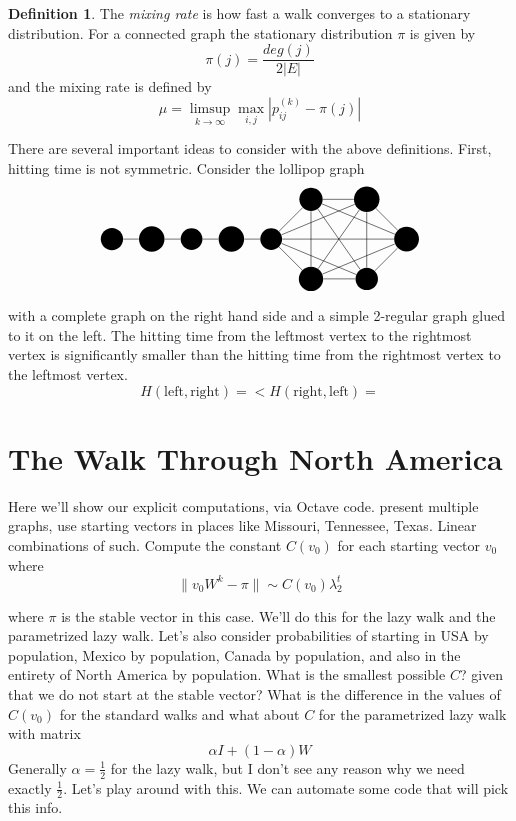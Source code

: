 \documentclass{article}
\theoremstyle{definition}
\newtheorem{defn}[thm]{Definition}
\theoremstyle{remark}
\numberwithin{equation}{section}
\begin{document}
\begin{defn}
The \emph{mixing rate} is how fast a walk converges to a stationary distribution.  For a connected graph the stationary distribution $\pi$ is given by
\begin{equation}
\pi(j) = \frac{deg(j)}{2|E|}
\end{equation}
and the mixing rate is defined by
\begin{equation}
\mu = \limsup_{k\rightarrow \infty} \max_{i,j} \left| p_{ij}^{(k)} - \pi(j) \right|
\end{equation}
\end{defn}

There are several important ideas to consider with the above definitions.  First, hitting time is not symmetric.  Consider the lollipop graph
\[
\begin{tikzpicture}
\node[circle, fill](a) at (0,0){a}; 
\node[circle, fill](b) at (1,0){b};
\node[circle, fill](c) at (2,0){c}; 
\node[circle, fill](d) at (3,0){d};
\node[circle, fill](e) at (4,0){e}; 
\node[circle, fill](f) at (5,1){f};
\node[circle, fill](g) at (5,-1){g}; 
\node[circle, fill](h) at (6.4,1){h};
\node[circle, fill](i) at (6.4,-1){i};
\node[circle, fill](j) at (7.4,0){j};
\foreach \from/\to in {a/b,b/c,c/d,d/e,e/f,e/g,e/h,e/i,f/g,f/h,f/i,g/h,g/i,h/i,e/j,f/j,g/j,h/j,i/j}
 \draw (\from) -- (\to);
\end{tikzpicture}
\]

with a complete graph on the right hand side and a simple 2-regular graph glued to it on the left.  The hitting time from the leftmost vertex to the rightmost vertex is significantly smaller than the hitting time from the rightmost vertex to the leftmost vertex.
\[
H(\textrm{left},\textrm{right}) =  < H(\textrm{right},\textrm{left}) =
\]

\section{The Walk Through North America}

Here we'll show our explicit computations, via Octave code.  present multiple graphs, use starting vectors in places like Missouri, Tennessee, Texas.  Linear combinations of such.  Compute the constant
$C(v_0)$ for each starting vector $v_0$ where
\[
\| v_0 W^k - \pi \| \sim C(v_0)\lambda_2^t
\]
 
where $\pi$ is the stable vector in this case.  We'll do this for the lazy walk and the parametrized lazy walk.  Let's also consider probabilities of starting in USA by population, Mexico by population, Canada by population, and also in the entirety of North America by population.  What is the smallest possible $C$? given that we do not start at the stable vector?  What is the difference in the values of $C(v_0)$ for the standard walks and what about $C$ for the parametrized lazy walk with matrix
\[
\alpha I + (1-\alpha)W
\]  
Generally $\alpha = \frac{1}{2}$ for the lazy walk, but I don't see any reason why we need exactly $\frac{1}{2}$.  Let's play around with this.  We can automate some code that will pick this info. 
 
\end{document}
